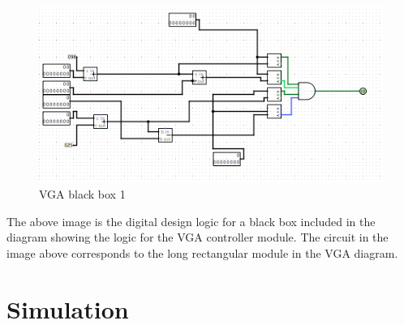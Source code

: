 \documentclass{article}
\begin{document}
\begin{figure}[H]
	\begin{center}
		\includegraphics[width=1\textwidth]{vgaBlackBox} 
		\caption{VGA black box 1}
	\end{center}
\end{figure}

The above image is the digital design logic for a black box included in the diagram showing the logic for the VGA controller module.  The circuit in the image above corresponds to the long rectangular module in the VGA diagram.



\section*{Simulation}

\end{document}
